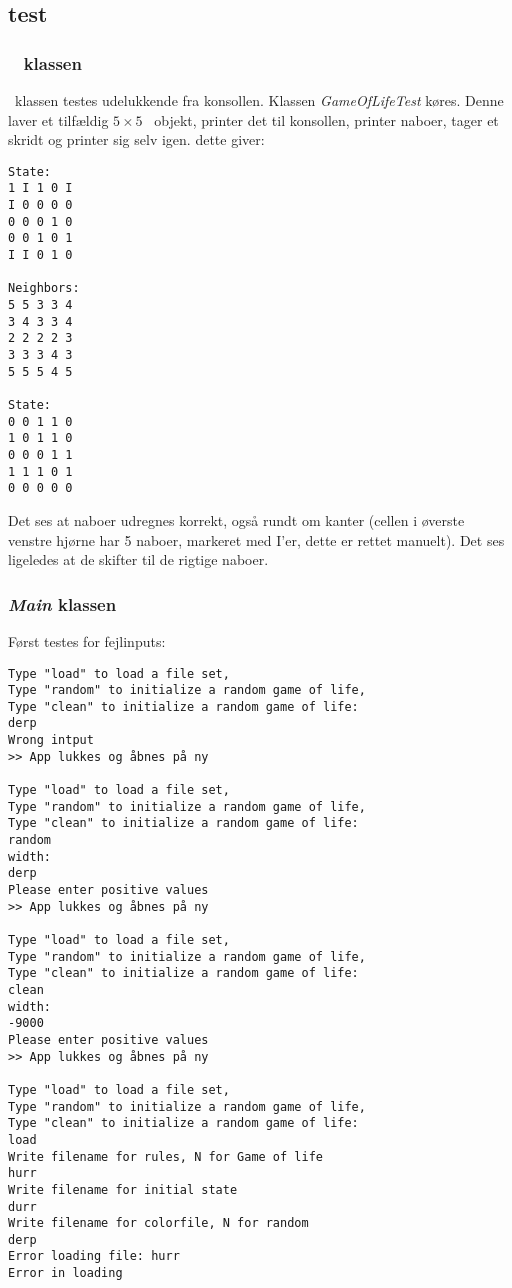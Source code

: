 \subsection{test}

\subsubsection{\gol~ klassen}
\gol~klassen testes udelukkende fra konsollen. Klassen \emph{GameOfLifeTest} køres.
Denne laver et tilfældig $5\times5$ \gol~objekt, printer det til konsollen, printer naboer, tager et skridt og printer sig selv igen.
dette giver:
\begin{lstlisting}[caption="test af \gol~objekt"]
State:
1 I 1 0 I 
I 0 0 0 0 
0 0 0 1 0 
0 0 1 0 1 
I I 0 1 0 

Neighbors:
5 5 3 3 4 
3 4 3 3 4 
2 2 2 2 3 
3 3 3 4 3 
5 5 5 4 5 

State:
0 0 1 1 0 
1 0 1 1 0 
0 0 0 1 1 
1 1 1 0 1 
0 0 0 0 0 
\end{lstlisting}

Det ses at naboer udregnes korrekt, også rundt om kanter (cellen i øverste venstre hjørne har 5 naboer, markeret med I'er, dette er rettet manuelt).
Det ses ligeledes at de skifter til de rigtige naboer.

\subsubsection{\gol\emph{Main} klassen}

Først testes for fejlinputs:
\begin{lstlisting}[caption="test af feljinputs"]
Type "load" to load a file set,
Type "random" to initialize a random game of life,
Type "clean" to initialize a random game of life:
derp
Wrong intput
>> App lukkes og åbnes på ny

Type "load" to load a file set,
Type "random" to initialize a random game of life,
Type "clean" to initialize a random game of life:
random
width:
derp
Please enter positive values
>> App lukkes og åbnes på ny

Type "load" to load a file set,
Type "random" to initialize a random game of life,
Type "clean" to initialize a random game of life:
clean
width:
-9000
Please enter positive values
>> App lukkes og åbnes på ny

Type "load" to load a file set,
Type "random" to initialize a random game of life,
Type "clean" to initialize a random game of life:
load
Write filename for rules, N for Game of life
hurr
Write filename for initial state
durr
Write filename for colorfile, N for random
derp
Error loading file: hurr
Error in loading
\end{lstlisting}

